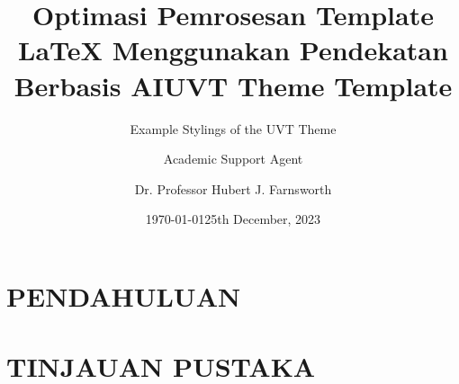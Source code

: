 \documentclass{beamer}
\title{Optimasi Pemrosesan Template LaTeX Menggunakan Pendekatan Berbasis AI}
\author{Academic Support Agent}
\date{\today}
\begin{document}
\maketitle

\begin{abstract}

\end{abstract}

\chapter{PENDAHULUAN}


\chapter{TINJAUAN PUSTAKA}


\usepackage{booktabs}



\beamertemplatenavigationsymbolsempty


\usepackage{ifpdf}
\ifmyriadproenabled\else
    \ifpdftex
        \usepackage{helvet}
    \else
        \setsansfont{Nimbus Sans}
    \fi
\fi



\title{UVT Theme Template}
\subtitle{Example Stylings of the UVT Theme}
\author[H. J. F.]{Dr. Professor Hubert J. Farnsworth}
\date{25th December, 2023}

\end{document}
